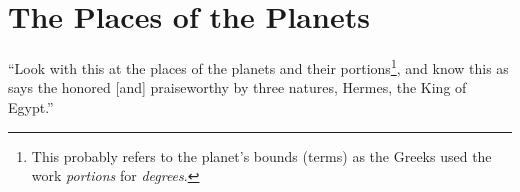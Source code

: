 \section{The Places of the Planets}
``Look with this at the places of the planets and their portions\footnote{This probably refers to the planet's bounds (terms) as the Greeks used the work \textsl{portions} for \textsl{degrees}.}, and know this as says the honored [and] praiseworthy by three natures, Hermes, the King of Egypt.''